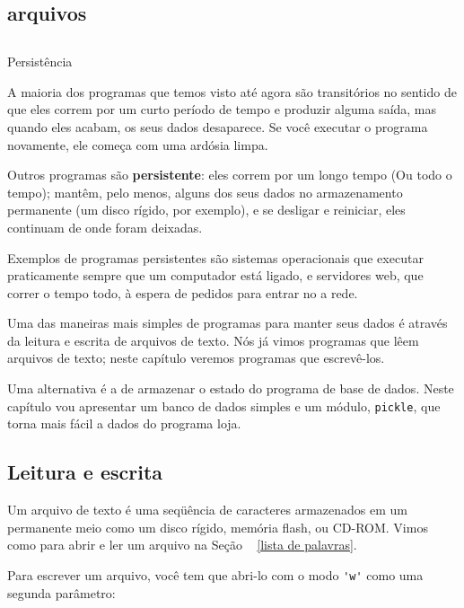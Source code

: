 \documentclass[10pt]{book}
\begin{document}
\begin{v erbatim}
\chapter{arquivos}


\section{} Persistência

A maioria dos programas que temos visto até agora são transitórios no
sentido de que eles correm por um curto período de tempo e produzir alguma saída,
mas quando eles acabam, os seus dados desaparece. Se você executar o programa
novamente, ele começa com uma ardósia limpa.

Outros programas são {\bf persistente}: eles correm por um longo tempo
(Ou todo o tempo); mantêm, pelo menos, alguns dos seus dados
no armazenamento permanente (um disco rígido, por exemplo), e
se desligar e reiniciar, eles continuam de onde foram deixadas.

Exemplos de programas persistentes são sistemas operacionais que
executar praticamente sempre que um computador está ligado, e servidores web,
que correr o tempo todo, à espera de pedidos para entrar no
a rede.

Uma das maneiras mais simples de programas para manter seus dados
é através da leitura e escrita de arquivos de texto. Nós já vimos
programas que lêem arquivos de texto; neste capítulo veremos programas
que escrevê-los.

Uma alternativa é a de armazenar o estado do programa de base de dados.
Neste capítulo vou apresentar um banco de dados simples e um módulo,
{\tt pickle}, que torna mais fácil a dados do programa loja.


\section{Leitura e escrita}

Um arquivo de texto é uma seqüência de caracteres armazenados em um permanente
meio como um disco rígido, memória flash, ou CD-ROM. Vimos como
para abrir e ler um arquivo na Seção ~ \ref {lista de palavras}.

Para escrever um arquivo, você tem que abri-lo com o modo \verb "'w'" como uma segunda
parâmetro:


\end{v erbatim}
\end{document}

